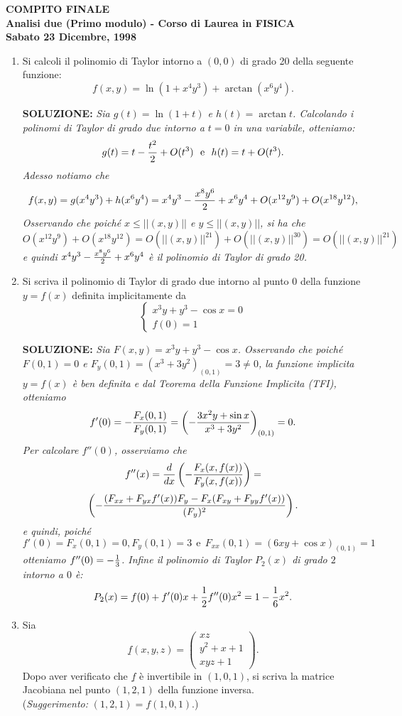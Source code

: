 \documentclass[12pt,a4paper]{report}\pagenumbering{roman}
\begin{document}
\begin{center}
{\bf COMPITO FINALE}\\
{\bf Analisi due (Primo modulo) - Corso di Laurea in FISICA}\\
{\bf Sabato 23 Dicembre, 1998}
\end{center}
\begin{enumerate}
\item Si calcoli il polinomio di Taylor intorno a $(0,0)$ di grado 20
della seguente funzione:
$$f(x,y)=\ln(1+x^4y^3)+\arctan(x^6y^4).$$
\bigskip 

{\bf SOLUZIONE:} {\sl Sia $g(t)=\ln(1+t)$ e $h(t)=\arctan t$. Calcolando
i polinomi di Taylor di grado due intorno a $t=0$ in una variabile, 
otteniamo:
$$g(t)=t-{t^2\over2}+O(t^3)\ \ \mbox{e}\ \ h(t)=t+O(t^3).$$
Adesso notiamo che
$$f(x,y)=g(x^4y^3)+h(x^6y^4)=x^4y^3-{x^8y^6\over2}+x^6y^4+O(x^{12}y^9)+
O(x^{18}y^{12}),$$
Osservando che poich\'e $x\leq||(x,y)||$ e $y\leq||(x,y)||$, si ha che
$$O(x^{12}y^9)+
O(x^{18}y^{12})=O(||(x,y)||^{21})+O(||(x,y)||^{30})=O(||(x,y)||^{21})$$
e quindi $x^4y^3-{x^8y^6\over2}+x^6y^4$ \`e il polinomio di Taylor
di grado 20.}\bigskip

\item Si scriva il polinomio di Taylor di grado due intorno al punto $0$
della funzione $y=f(x)$ definita implicitamente da
$$\left\{\begin{array}{l}
x^3y+y^3-\cos x=0\\
f(0)=1
\end{array}\right.$$

{\bf SOLUZIONE:} {\sl Sia $F(x,y)=x^3y+y^3-\cos x$. Osservando che
poich\'e $F(0,1)=0$ e $F_y(0,1)=\left(x^3+3y^2\right)_{(0,1)}=3\neq0$,
la funzione implicita $y=f(x)$ \`e ben definita e dal Teorema della
Funzione Implicita (TFI), otteniamo 
$$f'(0)=-{F_x(0,1)\over F_y(0,1)}=
\left(-{3x^2y+\sin x\over x^3+3y^2}\right)_{(0,1)}=0.$$
Per calcolare $f''(0)$, osserviamo che
$$f''(x)={d\over dx}\left(-{F_x(x,f(x))\over F_y(x,f(x))}\right)=$$
$$\left(-{(F_{xx}+F_{yx}f'(x))F_y-
F_x(F_{xy}+F_{yy}f'(x))\over (F_y)^2}\right).$$
e quindi, poich\'e 
$$f'(0)=F_{x}(0,1)=0, F_y(0,1)=3\ \ \mbox{e}\ \ F_{xx}(0,1)=\left(6xy+\cos x\right)_{(0,1)}=1$$
otteniamo $f''(0)=-{1\over3}$. Infine il polinomio di Taylor $P_2(x)$ 
di grado $2$ intorno a $0$ \`e:
$$P_2(x)=f(0)+f'(0)x+{1\over2}f''(0)x^2=1-{1\over6}x^2.$$}

\item  Sia
$$\underline{f}(x,y,z)=\left(\begin{array}{l}
xz\\
y^2+x+1\\
xyz+1\end{array}
\right).$$ 
Dopo aver verificato che $\underline{f}$ \`e invertibile in $(1,0,1)$,
si scriva la matrice Jacobiana nel punto $(1,2,1)$ della
funzione inversa.\\
({\it Suggerimento:} $(1,2,1)=f(1,0,1)$.)
\bigskip 


\end{enumerate}
\end{document}
